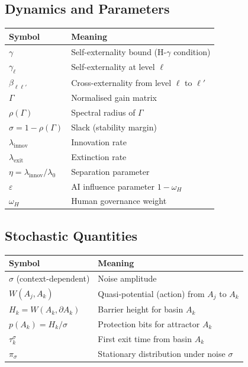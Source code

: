 \documentclass[12pt]{article}
\begin{document}
\subsection{Dynamics and Parameters}

\begin{tabular}{ll}
\toprule
\textbf{Symbol} & \textbf{Meaning} \\
\midrule
$\gamma$ & Self-externality bound (H-$\gamma$ condition) \\
$\gamma_\ell$ & Self-externality at level $\ell$ \\
$\beta_{\ell\ell'}$ & Cross-externality from level $\ell$ to $\ell'$ \\
$\Gamma$ & Normalised gain matrix \\
$\rho(\Gamma)$ & Spectral radius of $\Gamma$ \\
$\sigma = 1 - \rho(\Gamma)$ & Slack (stability margin) \\
$\lambda_{\text{innov}}$ & Innovation rate \\
$\lambda_{\text{exit}}$ & Extinction rate \\
$\eta = \lambda_{\text{innov}} / \lambda_0$ & Separation parameter \\
$\varepsilon$ & AI influence parameter $1 - \omega_H$ \\
$\omega_H$ & Human governance weight \\
\bottomrule
\end{tabular}

\subsection{Stochastic Quantities}

\begin{tabular}{ll}
\toprule
\textbf{Symbol} & \textbf{Meaning} \\
\midrule
$\sigma$ (context-dependent) & Noise amplitude \\
$W(A_j, A_k)$ & Quasi-potential (action) from $A_j$ to $A_k$ \\
$H_k = W(A_k, \partial A_k)$ & Barrier height for basin $A_k$ \\
$p(A_k) = H_k / \sigma$ & Protection bits for attractor $A_k$ \\
$\tau_k^\sigma$ & First exit time from basin $A_k$ \\
$\pi_\sigma$ & Stationary distribution under noise $\sigma$ \\
\bottomrule
\end{tabular}
\end{document}
